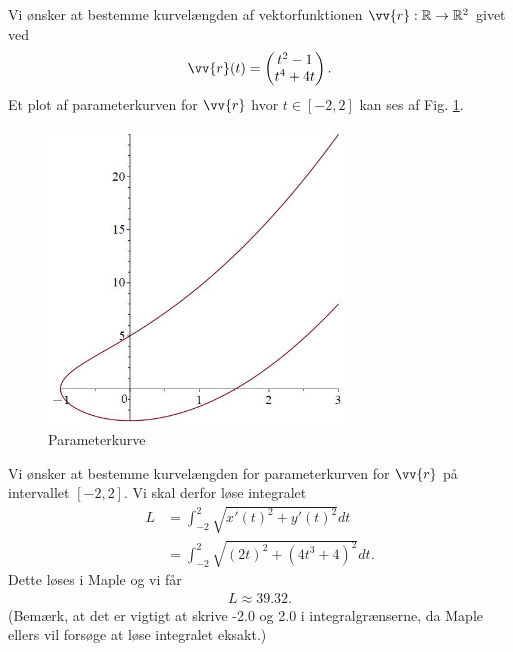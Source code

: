 \begin{exa}
	Vi ønsker at bestemme kurvelængden af vektorfunktionen $\vv{r}: \mathbb{R} \to \mathbb{R}^2$ givet ved
	\begin{align*}
		\vv{r}(t) = 
		\begin{pmatrix}
			t^2-1 \\
			t^4+4t
		\end{pmatrix}.
	\end{align*}
	Et plot af parameterkurven for $\vv{r}$ hvor $t\in [-2,2]$ kan ses af Fig. \ref{fig:kurvelaengde}.
	\begin{figure}[H]
		\centering
		\includegraphics[width=0.7\textwidth]{Billeder/kurvelaengde.jpg}
		\caption{Parameterkurve}
		\label{fig:kurvelaengde}	
	\end{figure}
	Vi ønsker at bestemme kurvelængden for parameterkurven for $\vv{r}$ på intervallet $[-2,2]$. Vi skal derfor løse integralet
	\begin{align*}
		L &= \int_{-2}^2 \sqrt{x'(t)^2+y'(t)^2}dt \\
		&=\int_{-2}^2\sqrt{(2t)^2+(4t^3+4)^2} dt.
	\end{align*}
	Dette løses i Maple og vi får
	\begin{align*}
		L \approx 39.32.
	\end{align*}
	(Bemærk, at det er vigtigt at skrive -2.0 og 2.0 i integralgrænserne, da Maple ellers vil forsøge at løse integralet eksakt.)
\end{exa}

